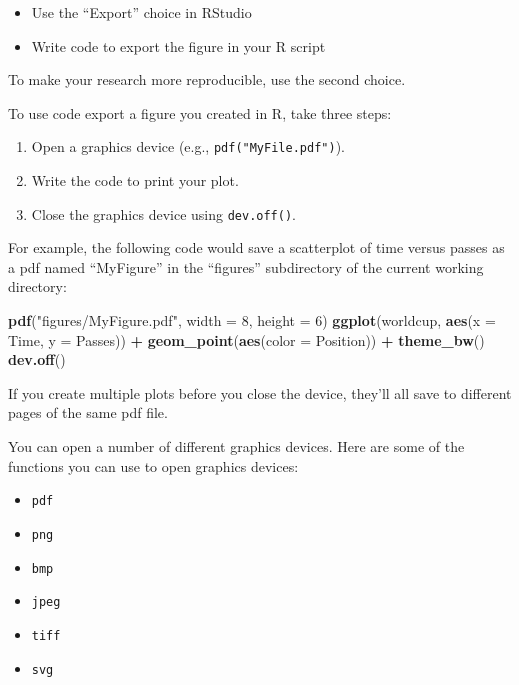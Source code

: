 \documentclass[]{book}
\makeatletter
\newenvironment{Shaded}{\begin{snugshade}}{\end{snugshade}}
\newcommand{\KeywordTok}[1]{\textcolor[rgb]{0.13,0.29,0.53}{\textbf{#1}}}
\newcommand{\DataTypeTok}[1]{\textcolor[rgb]{0.13,0.29,0.53}{#1}}
\newcommand{\DecValTok}[1]{\textcolor[rgb]{0.00,0.00,0.81}{#1}}
\newcommand{\StringTok}[1]{\textcolor[rgb]{0.31,0.60,0.02}{#1}}
\newcommand{\OperatorTok}[1]{\textcolor[rgb]{0.81,0.36,0.00}{\textbf{#1}}}
\newcommand{\NormalTok}[1]{#1}
\providecommand{\tightlist}{%
  \setlength{\itemsep}{0pt}\setlength{\parskip}{0pt}}
\newenvironment{kframe}{%
\medskip{}
\setlength{\fboxsep}{.8em}
 \def\at@end@of@kframe{}%
 \ifinner\ifhmode%
  \def\at@end@of@kframe{\end{minipage}}%
  \begin{minipage}{\columnwidth}%
 \fi\fi%
 \def\FrameCommand##1{\hskip\@totalleftmargin \hskip-\fboxsep
 \colorbox{shadecolor}{##1}\hskip-\fboxsep
     \hskip-\linewidth \hskip-\@totalleftmargin \hskip\columnwidth}%
 \MakeFramed {\advance\hsize-\width
   \@totalleftmargin\z@ \linewidth\hsize
   \@setminipage}}%
 {\par\unskip\endMakeFramed%
 \at@end@of@kframe}
\renewenvironment{Shaded}{\begin{kframe}}{\end{kframe}}
\theoremstyle{definition}
\theoremstyle{definition}
\theoremstyle{definition}
\theoremstyle{remark}
\makeatother
\begin{document}
\begin{itemize}
\tightlist
\item
  Use the ``Export'' choice in RStudio
\item
  Write code to export the figure in your R script
\end{itemize}

To make your research more reproducible, use the second choice.

To use code export a figure you created in R, take three steps:

\begin{enumerate}
\def\labelenumi{\arabic{enumi}.}
\tightlist
\item
  Open a graphics device (e.g., \texttt{pdf("MyFile.pdf")}).
\item
  Write the code to print your plot.
\item
  Close the graphics device using \texttt{dev.off()}.
\end{enumerate}

For example, the following code would save a scatterplot of time versus
passes as a pdf named ``MyFigure'' in the ``figures'' subdirectory of
the current working directory:

\begin{Shaded}
\begin{Highlighting}[]
\KeywordTok{pdf}\NormalTok{(}\StringTok{"figures/MyFigure.pdf"}\NormalTok{, }\DataTypeTok{width =} \DecValTok{8}\NormalTok{, }\DataTypeTok{height =} \DecValTok{6}\NormalTok{)}
\KeywordTok{ggplot}\NormalTok{(worldcup, }\KeywordTok{aes}\NormalTok{(}\DataTypeTok{x =}\NormalTok{ Time, }\DataTypeTok{y =}\NormalTok{ Passes)) }\OperatorTok{+}\StringTok{ }
\StringTok{        }\KeywordTok{geom_point}\NormalTok{(}\KeywordTok{aes}\NormalTok{(}\DataTypeTok{color =}\NormalTok{ Position)) }\OperatorTok{+}\StringTok{ }
\StringTok{        }\KeywordTok{theme_bw}\NormalTok{()}
\KeywordTok{dev.off}\NormalTok{()}
\end{Highlighting}
\end{Shaded}

If you create multiple plots before you close the device, they'll all
save to different pages of the same pdf file.

You can open a number of different graphics devices. Here are some of
the functions you can use to open graphics devices:

\begin{itemize}
\tightlist
\item
  \texttt{pdf}
\item
  \texttt{png}
\item
  \texttt{bmp}
\item
  \texttt{jpeg}
\item
  \texttt{tiff}
\item
  \texttt{svg}
\end{itemize}
\end{document}
